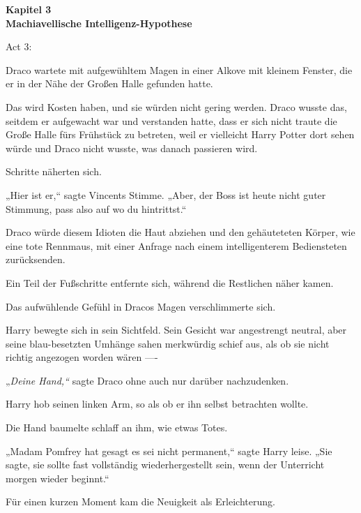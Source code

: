 

\hypertarget{machiavellische-intelligenz-hypothese}{%

\textbf{Kapitel 3}\\ \textbf{Machiavellische Intelligenz-Hypothese}

Act 3:

Draco wartete mit aufgewühltem Magen in einer Alkove mit kleinem Fenster, die er in der Nähe der Großen Halle gefunden hatte.

Das wird Kosten haben, und sie würden nicht gering werden. Draco wusste das, seitdem er aufgewacht war und verstanden hatte, dass er sich nicht traute die Große Halle fürs Frühstück zu betreten, weil er vielleicht Harry Potter dort sehen würde und Draco nicht wusste, was danach passieren wird.

Schritte näherten sich.

„Hier ist er,“ sagte Vincents Stimme. „Aber, der Boss ist heute nicht guter Stimmung, pass also auf wo du hintrittst.“

Draco würde diesem Idioten die Haut abziehen und den gehäuteteten Körper, wie eine tote Rennmaus, mit einer Anfrage nach einem intelligenterem Bediensteten zurücksenden.

Ein Teil der Fußschritte entfernte sich, während die Restlichen näher kamen.

Das aufwühlende Gefühl in Dracos Magen verschlimmerte sich.

Harry bewegte sich in sein Sichtfeld. Sein Gesicht war angestrengt neutral, aber seine blau-besetzten Umhänge sahen merkwürdig schief aus, als ob sie nicht richtig angezogen worden wären ----

„\emph{Deine Hand,“} sagte Draco ohne auch nur darüber nachzudenken.

Harry hob seinen linken Arm, so als ob er ihn selbst betrachten wollte.

Die Hand baumelte schlaff an ihm, wie etwas Totes.

„Madam Pomfrey hat gesagt es sei nicht permanent,“ sagte Harry leise. „Sie sagte, sie sollte fast vollständig wiederhergestellt sein, wenn der Unterricht morgen wieder beginnt.“

Für einen kurzen Moment kam die Neuigkeit als Erleichterung.

}
